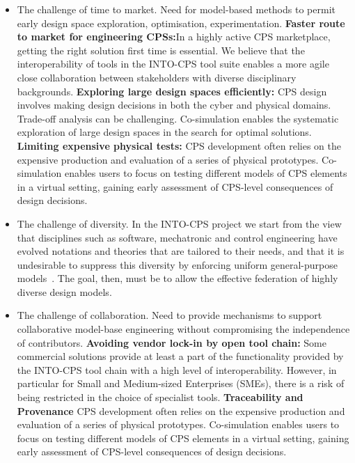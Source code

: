 \begin{itemize}
\item The challenge of time to market. Need for model-based methods to permit early design space exploration, optimisation, experimentation. \textbf{Faster route to market for engineering CPSs:}In a highly active CPS marketplace, getting the right solution first time is essential. We believe that the interoperability of tools in the INTO-CPS tool suite enables a more agile close collaboration between stakeholders with diverse disciplinary backgrounds. \textbf{Exploring large design spaces efficiently:} CPS design involves making design decisions in both the cyber and physical domains. Trade-off analysis can be challenging. Co-simulation enables the systematic exploration of large design spaces in the search for optimal solutions. \textbf{Limiting expensive physical tests:} CPS development often relies on the expensive production and evaluation of a series of physical prototypes. Co-simulation enables users to focus on testing different models of CPS elements in a virtual setting, gaining early assessment of CPS-level consequences of design decisions.

\item The challenge of diversity. In the INTO-CPS project we start from the view that disciplines such as software, mechatronic and control engineering have evolved notations and theories that are tailored to their needs, and that it is undesirable to suppress this diversity by enforcing uniform general-purpose models~\cite{Fitzgerald&15,Larsen&16e}. The goal, then, must be to allow the effective federation of highly diverse design models.

\item The challenge of collaboration. Need to provide mechanisms to support collaborative model-base engineering without compromising the independence of contributors. \textbf{Avoiding vendor lock-in by open tool chain:} Some commercial solutions provide at least a part of the functionality provided by the INTO-CPS tool chain with a high level of interoperability. However, in particular for Small and Medium-sized Enterprises (SMEs), there is a risk of being restricted in the choice of specialist tools. \textbf{Traceability and Provenance} CPS development often relies on the expensive production and evaluation of a series of physical prototypes. Co-simulation enables users to focus on testing different models of CPS elements in a virtual setting, gaining early assessment of CPS-level consequences of design decisions.
\end{itemize} 



